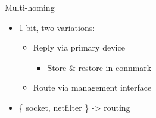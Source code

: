 \documentclass[black,white,aspectratio=169]{beamer}
\DeclareRobustCommand{\#}{\adjustbox{valign=B,totalheight=.57\baselineskip}{\oldhash}}%
\newcommand\todo[1]{
    \textcolor{red}{#1}
}
\begin{document}
    \begin{frame}{Multi-homing}
        \begin{itemize}
            \item 1 bit, two variations:~\smallskip
            \begin{itemize}
                \item Reply via primary device~\smallskip
                \begin{itemize}
                    \item Store \& restore in connmark~\medskip
                \end{itemize}
                \item Route via management interface~\medskip
            \end{itemize}
            \item \{ socket, netfilter \} -> routing~\medskip
        \end{itemize}
    \end{frame}
\end{document}
